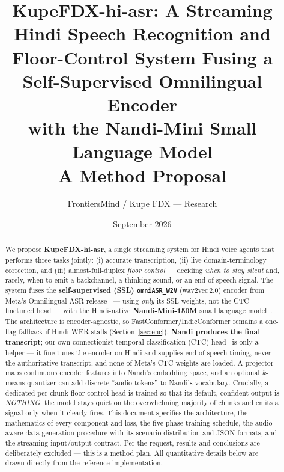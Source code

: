 \documentclass[11pt]{article}
\title{\textbf{KupeFDX-hi-asr: A Streaming Hindi Speech Recognition and\\
Floor-Control System Fusing a Self-Supervised Omnilingual Encoder\\
with the Nandi-Mini Small Language Model}\\[4pt]
\large A Method Proposal}
\author{FrontiersMind / Kupe FDX --- Research}
\date{September 2026}
\newcommand{\code}[1]{\texttt{#1}}
\begin{document}
\maketitle

\begin{abstract}
\noindent
We propose \textbf{KupeFDX-hi-asr}, a single streaming system for Hindi voice agents that
performs three tasks jointly: (i) accurate transcription, (ii) live domain-terminology
correction, and (iii) almost-full-duplex \emph{floor control} --- deciding \emph{when to
stay silent} and, rarely, when to emit a backchannel, a thinking-sound, or an
end-of-speech signal. The system fuses the \textbf{self-supervised (SSL) \code{omniASR\_W2V}} (wav2vec\,2.0) encoder
from Meta's Omnilingual ASR release~\cite{omni} --- using \emph{only} its SSL weights, not the
CTC-finetuned head --- with the Hindi-native \textbf{Nandi-Mini-150M} small language
model~\cite{nandi}. The architecture is encoder-agnostic, so FastConformer/IndicConformer
remains a one-flag fallback if Hindi WER stalls (Section~\ref{sec:enc}). \textbf{Nandi
produces the final transcript}; our own connectionist-temporal-classification (CTC)
head~\cite{ctc} is only a helper --- it fine-tunes the encoder on Hindi and supplies
end-of-speech timing, never the authoritative transcript, and none of Meta's CTC weights are
loaded. A projector maps continuous encoder features into Nandi's embedding space, and an
optional $k$-means quantizer can add discrete ``audio tokens'' to Nandi's vocabulary. Crucially, a dedicated
per-chunk floor-control head is trained so that its default, confident output is
\emph{NOTHING}: the model stays quiet on the overwhelming majority of chunks and emits a
signal only when it clearly fires. This document specifies the architecture, the
mathematics of every component and loss, the five-phase training schedule, the
audio-aware data-generation procedure with its scenario distribution and JSON formats, and
the streaming input/output contract. Per the request, results and conclusions are
deliberately excluded --- this is a method plan. All quantitative details below are drawn
directly from the reference implementation.
\end{abstract}
\end{document}
